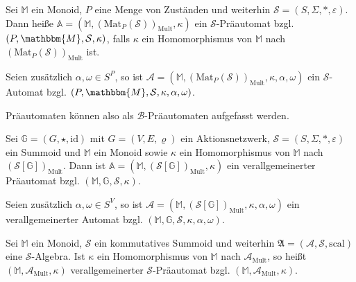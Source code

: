 \documentclass{article}
\begin{document}
\begin{definition}
  Sei $\mathbb{M}$ ein Monoid,
  $P$ eine Menge von Zuständen
  und weiterhin $\mathcal{S} = (S, \Sigma, \ast, \varepsilon)$.
  Dann heiße $\mathbb{A} = (\mathbb{M}, (\text{Mat}_P(\mathcal{S}))_\text{Mult}, \kappa)$
  ein $\mathcal{S}$-Präautomat bzgl. $(P, \mathbbm{M}, \mathcal{S}, \kappa)$,
  falls $\kappa$ ein Homomorphismus von $\mathbb{M}$ nach $(\text{Mat}_P(\mathcal{S}))_\text{Mult}$
  ist.

  Seien zusätzlich $\alpha, \omega \in S^P$,
  so ist $\mathcal{A} = (\mathbb{M}, (\text{Mat}_P(\mathcal{S}))_\text{Mult}, \kappa, \alpha, \omega)$
  ein $\mathcal{S}$-Automat bzgl. $(P, \mathbbm{M}, \mathcal{S}, \kappa, \alpha, \omega)$.
\end{definition}

\begin{remark}
  Präautomaten können also als $\mathcal{B}$-Präautomaten aufgefasst werden.
\end{remark}

\begin{definition}
  Sei $\mathbb{G} = (G, \star, \text{id})$ mit $G = (V, E, \varrho)$ ein Aktionsnetzwerk, 
  $\mathcal{S} = (S, \Sigma, \ast, \varepsilon)$ ein Summoid
  und $\mathbb{M}$ ein Monoid
  sowie $\kappa$ ein Homomorphismus von $\mathbb{M}$ nach $(\mathcal{S}[\mathbb{G}])_\text{Mult}$.
  Dann ist $\mathbb{A} = (\mathbb{M}, (\mathcal{S}[\mathbb{G}])_\text{Mult}, \kappa)$
  ein verallgemeinerter Präautomat bzgl. $(\mathbb{M}, \mathbb{G}, \mathcal{S}, \kappa)$.

  Seien zusätzlich $\alpha, \omega \in S^V$,
  so ist
  $\mathcal{A} = (\mathbb{M}, (\mathcal{S}[\mathbb{G}])_\text{Mult}, \kappa, \alpha, \omega)$
  ein verallgemeinerter Automat
  bzgl. $(\mathbb{M}, \mathbb{G}, \mathcal{S}, \kappa, \alpha, \omega)$.
\end{definition}

\begin{definition}
  Sei $\mathbb{M}$ ein Monoid,
  $\mathcal{S}$ ein kommutatives Summoid
  und weiterhin $\mathfrak{A} = (\mathcal{A}, \mathcal{S}, \text{scal})$
  eine $\mathcal{S}$-Algebra.
  Ist $\kappa$ ein Homomorphismus von $\mathbb{M}$ nach $\mathcal{A}_\text{Mult}$,
  so heißt $(\mathbb{M}, \mathcal{A}_\text{Mult}, \kappa)$
  verallgemeinerter $\mathcal{S}$-Präautomat bzgl. $(\mathbb{M}, \mathcal{A}_\text{Mult}, \kappa)$.
\end{definition}
\end{document}
